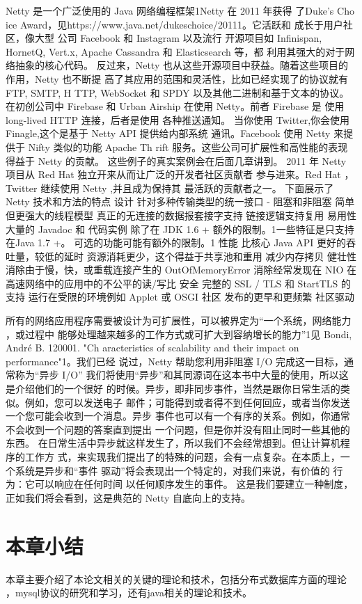 Netty 是一个广泛使用的 Java 网络编程框架1Netty 在 2011 年获得
了Duke's Cho
ice Award，见https://www.java.net/dukeschoice/20111。它活跃和
成长于用户社区，像大型
公司 Facebook 和 Instagram 以及流行 开源项目如 Infinispan,
 HornetQ, Vert.x, Apache Cassandra 和 Elasticsearch 等，都
利用其强大的对于网络抽象的核心代码。
反过来，Netty 也从这些开源项目中获益。随着这些项目的作用，Netty 也不断提
高了其应用的范围和灵活性，比如已经实现了的协议就有 FTP, SMTP, H
TTP, WebSocket 和 SPDY 以及其他二进制和基于文本的协议。
在初创公司中 Firebase 和 Urban Airship 在使用 Netty。前者 Firebase 是
使用 long-lived HTTP 连接，后者是使用 各种推送通知。
当你使用 Twitter,你会使用 Finagle,这个是基于 Netty API 提供给内部系统
通讯。Facebook 使用 Netty 来提供于 Nifty 类似的功能 Apache Th
rift 服务。这些公司可扩展性和高性能的表现得益于 Netty 的贡献。
这些例子的真实案例会在后面几章讲到。
2011 年 Netty 项目从 Red Hat 独立开来从而让广泛的开发者社区贡献者
参与进来。Red Hat ，Twitter 继续使用 Netty ,并且成为保持其
最活跃的贡献者之一。
下面展示了 Netty 技术和方法的特点
设计
针对多种传输类型的统一接口 - 阻塞和非阻塞
简单但更强大的线程模型
真正的无连接的数据报套接字支持
链接逻辑支持复用
易用性
大量的 Javadoc 和 代码实例
除了在 JDK 1.6 + 额外的限制。1一些特征是只支持在Java 1.7 +。
可选的功能可能有额外的限制。1
性能
比核心 Java API 更好的吞吐量，较低的延时
资源消耗更少，这个得益于共享池和重用
减少内存拷贝
健壮性
消除由于慢，快，或重载连接产生的 OutOfMemoryError
消除经常发现在 NIO 在高速网络中的应用中的不公平的读/写比
安全
完整的 SSL / TLS 和 StartTLS 的支持
运行在受限的环境例如 Applet 或 OSGI
社区
发布的更早和更频繁
社区驱动

所有的网络应用程序需要被设计为可扩展性，可以被界定为“一个系统，网络能力
，或过程中
能够处理越来越多的工作方式或可扩大到容纳增长的能力”1见 Bondi, André B.
 120001. "Ch
aracteristics of scalability and their impact on performance"1。我们已经
说过，Netty 帮助您利用非阻塞 I/O 完成这一目标，通常称为“异步 I/O”
我们将使用“异步”和其同源词在这本书中大量的使用，所以这是介绍他们的一个很好
的时候。异步，即非同步事件，当然是跟你日常生活的类似。例如，您可以发送电子
邮件；可能得到或者得不到任何回应，或者当你发送一个您可能会收到一个消息。异步
事件也可以有一个有序的关系。例如，你通常不会收到一个问题的答案直到提出
一个问题，但是你并没有阻止同时一些其他的东西。
在日常生活中异步就这样发生了，所以我们不会经常想到。但让计算机程序的工作方
式，来实现我们提出了的特殊的问题，会有一点复杂。在本质上，一个系统是异步和“事件
驱动”将会表现出一个特定的，对我们来说，有价值的 行为：它可以响应在任何时间
以任何顺序发生的事件。
这是我们要建立一种制度，正如我们将会看到，这是典范的 Netty 自底向上的支持。
\section{本章小结}
本章主要介绍了本论文相关的关键的理论和技术，包括分布式数据库方面的理论
，mysql协议的研究和学习，还有java相关的理论和技术。
